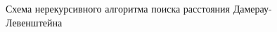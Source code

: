 \begin{figure}[h]
	
	
	\caption{Схема нерекурсивного алгоритма поиска расстояния Дамерау-Левенштейна}
	
	\label{fig:DamerauLeven}
\end{figure}

\clearpage

